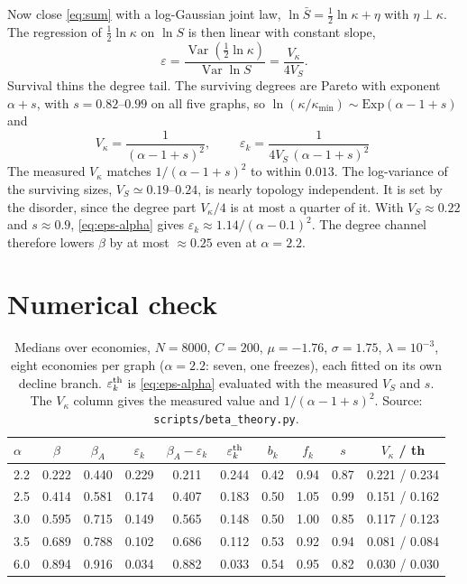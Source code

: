 \documentclass[11pt]{article}
\newcommand{\Var}{\operatorname{Var}}
\theoremstyle{remark}
\begin{document}
Now close \eqref{eq:sum} with a log-Gaussian joint law, $\ln\bar S=\tfrac12\ln\kappa+\eta$ with
$\eta\perp\kappa$.  The regression of $\tfrac12\ln\kappa$ on $\ln S$ is then linear with
constant slope,
\begin{equation}
  \varepsilon=\frac{\Var(\tfrac12\ln\kappa)}{\Var\ln S}=\frac{V_\kappa}{4V_S}.
  \label{eq:eps-closure}
\end{equation}
Survival thins the degree tail.  The surviving degrees are Pareto with exponent $\alpha+s$, with
$s=0.82$--$0.99$ on all five graphs, so $\ln(\kappa/\kappa_{\min})\sim\mathrm{Exp}(\alpha-1+s)$
and
\begin{equation}
  V_\kappa=\frac{1}{(\alpha-1+s)^2},
  \qquad
  \boxed{\;\varepsilon_k=\frac{1}{4V_S\,(\alpha-1+s)^2}\;}
  \label{eq:eps-alpha}
\end{equation}
The measured $V_\kappa$ matches $1/(\alpha-1+s)^2$ to within $0.013$.  The log-variance of the
surviving sizes, $V_S\simeq0.19$--$0.24$, is nearly topology independent.  It is set by the
disorder, since the degree part $V_\kappa/4$ is at most a quarter of it.  With $V_S\approx0.22$ and
$s\approx0.9$, \eqref{eq:eps-alpha} gives $\varepsilon_k\approx1.14/(\alpha-0.1)^2$.  The degree
channel therefore lowers $\beta$ by at most $\approx0.25$ even at $\alpha=2.2$.

\section{Numerical check}

\begin{table}[h]
\centering
\small\setlength{\tabcolsep}{4pt}
\begin{tabular}{lcccc|ccccc}
\toprule
$\alpha$ & $\beta$ & $\beta_A$ & $\varepsilon_k$ & $\beta_A-\varepsilon_k$
 & $\varepsilon_k^{\rm th}$ & $b_k$ & $f_k$ & $s$ & $V_\kappa$ / th\\
\midrule
2.2 & 0.222 & 0.440 & 0.229 & 0.211 & 0.244 & 0.42 & 0.94 & 0.87 & 0.221 / 0.234\\
2.5 & 0.414 & 0.581 & 0.174 & 0.407 & 0.183 & 0.50 & 1.05 & 0.99 & 0.151 / 0.162\\
3.0 & 0.595 & 0.715 & 0.149 & 0.565 & 0.148 & 0.50 & 1.00 & 0.85 & 0.117 / 0.123\\
3.5 & 0.689 & 0.788 & 0.102 & 0.686 & 0.112 & 0.53 & 0.92 & 0.94 & 0.081 / 0.084\\
6.0 & 0.894 & 0.916 & 0.034 & 0.882 & 0.033 & 0.54 & 0.95 & 0.82 & 0.030 / 0.030\\
\bottomrule
\end{tabular}
\caption{Medians over economies, $N=8000$, $C=200$, $\mu=-1.76$, $\sigma=1.75$,
$\lambda=10^{-3}$, eight economies per graph ($\alpha=2.2$: seven, one freezes), each fitted on
its own decline branch.  $\varepsilon_k^{\rm th}$ is \eqref{eq:eps-alpha} evaluated with the
measured $V_S$ and $s$.  The $V_\kappa$ column gives the measured value and $1/(\alpha-1+s)^2$.
Source: \texttt{scripts/beta\_theory.py}.}
\label{tab:check}
\end{table}
\end{document}

